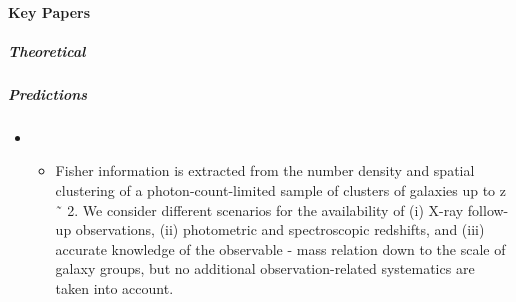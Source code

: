 \documentclass[letterpaper,10pt,english]{sphinxmanual}
\begin{document}
\paragraph{Key Papers}
\label{\detokenize{resource/astro/reference/cluster_cosmology:key-papers}}

\subparagraph{Theoretical}
\label{\detokenize{resource/astro/reference/cluster_cosmology:theoretical}}

\subparagraph{Predictions}
\label{\detokenize{resource/astro/reference/cluster_cosmology:predictions}}\begin{itemize}
\item {} 
\begin{itemize}
\item {} 
Fisher information is extracted from the number density and
spatial clustering of a photon-count-limited sample of clusters of
galaxies up to z ˜ 2. We consider different scenarios for the
availability of (i) X-ray follow-up observations, (ii) photometric
and spectroscopic redshifts, and (iii) accurate knowledge of the
observable - mass relation down to the scale of galaxy groups, but
no additional observation-related systematics are taken into
account.

\end{itemize}

\end{itemize}
\end{document}
